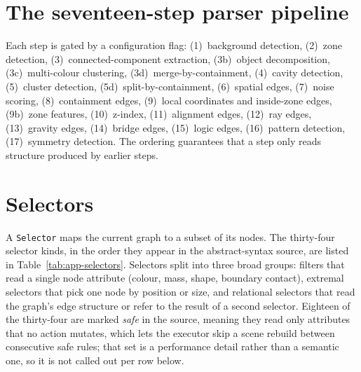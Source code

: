 \section{The seventeen-step parser pipeline}
\label{app:pipeline}

Each step is gated by a configuration flag: (1)~background detection, (2)~zone
detection, (3)~connected-component extraction, (3b)~object decomposition, (3c)~multi-colour
clustering, (3d)~merge-by-containment, (4)~cavity detection, (5)~cluster detection,
(5d)~split-by-containment, (6)~spatial edges, (7)~noise scoring, (8)~containment edges,
(9)~local coordinates and inside-zone edges, (9b)~zone features, (10)~z-index,
(11)~alignment edges, (12)~ray edges, (13)~gravity edges, (14)~bridge edges, (15)~logic
edges, (16)~pattern detection, (17)~symmetry detection. The ordering guarantees that a
step only reads structure produced by earlier steps.

\section{Selectors}
\label{app:selectors}

A \texttt{Selector} maps the current graph to a subset of its nodes. The thirty-four
selector kinds, in the order they appear in the abstract-syntax source, are listed in
Table~\ref{tab:app-selectors}. Selectors split into three broad groups: filters that read
a single node attribute (colour, mass, shape, boundary contact), extremal selectors that
pick one node by position or size, and relational selectors that read the graph's edge
structure or refer to the result of a second selector. Eighteen of the thirty-four are
marked \emph{safe} in the source, meaning they read only attributes that no action mutates,
which lets the executor skip a scene rebuild between consecutive safe rules; that set is a
performance detail rather than a semantic one, so it is not called out per row below.

